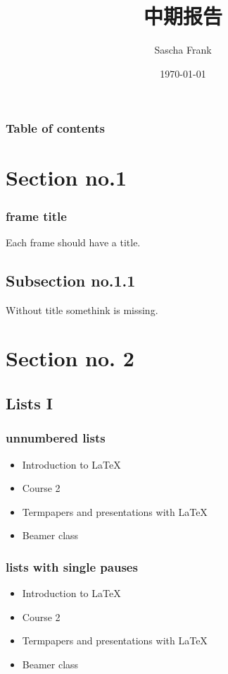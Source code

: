 \documentclass[hyperref={pdfpagelabels=false}]{beamer}
\title{中期报告}
\author{Sascha Frank}
\date{\today}
\begin{document}
\begin{frame}
\titlepage
\end{frame} 


\begin{frame}
\frametitle{Table of contents}
\tableofcontents
\end{frame} 


\section{Section no.1} 
\begin{frame}
\frametitle{frame title} 
Each frame should have a title.
\end{frame}
\subsection{Subsection no.1.1  }
\begin{frame}
Without title somethink is missing. 
\end{frame}


\section{Section no. 2} 
\subsection{Lists I}
\begin{frame}
\frametitle{unnumbered lists}
\begin{itemize}
\item Introduction to  \LaTeX{}  
\item Course 2 
\item Termpapers and presentations with \LaTeX{}  
\item Beamer class
\end{itemize} 
\end{frame}

\begin{frame}\frametitle{lists with single pauses}
\begin{itemize}
\item Introduction to  \LaTeX{}  \pause 
\item Course 2 \pause 
\item Termpapers and presentations with \LaTeX{}  \pause 
\item Beamer class
\end{itemize} 
\end{frame}
\end{document}
